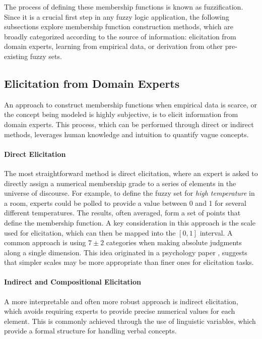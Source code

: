 The process of defining these membership functions is known as fuzzification. Since it is a crucial first step in any fuzzy logic application, the following subsections explore membership function construction methods, which are broadly categorized according to the source of information: elicitation from domain experts, learning from empirical data, or derivation from other pre-existing fuzzy sets.

\subsection{Elicitation from Domain Experts}
An approach to construct membership functions when empirical data is scarce, or the concept being modeled is highly subjective, is to elicit information from domain experts. This process, which can be performed through direct or indirect methods, leverages human knowledge and intuition to quantify vague concepts.

\paragraph{Direct Elicitation}
The most straightforward method is direct elicitation, where an expert is asked to directly assign a numerical membership grade to a series of elements in the universe of discourse. For example, to define the fuzzy set for \emph{high temperature} in a room, experts could be polled to provide a value between 0 and 1 for several different temperatures. The results, often averaged, form a set of points that define the membership function. A key consideration in this approach is the scale used for elicitation, which can then be mapped into the $[0,1]$ interval. A common approach is using $7\pm2$ categories when making absolute judgments along a single dimension. This idea originated in a psychology paper \cite{miller1956magical}, suggests that simpler scales may be more appropriate than finer ones for elicitation tasks.

\paragraph{Indirect and Compositional Elicitation}
A more interpretable and often more robust approach is indirect elicitation, which avoids requiring experts to provide precise numerical values for each element. This is commonly achieved through the use of linguistic variables, which provide a formal structure for handling verbal concepts.


